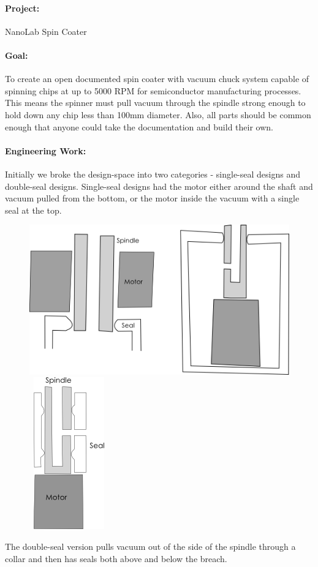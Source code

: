 \documentclass[12pt]{report}
\begin{document}
\paragraph{Project:} NanoLab Spin Coater
\paragraph{Goal:} To create an open documented spin coater with vacuum chuck system capable of spinning chips at up to 5000 RPM for semiconductor manufacturing processes. This means the spinner must pull vacuum through the spindle strong enough to hold down any chip less than 100mm diameter. Also, all parts should be common enough that anyone could take the documentation and build their own.

\paragraph{Engineering Work:} 
Initially we broke the design-space into two categories - single-seal designs and double-seal designs. Single-seal designs had the motor either around the shaft and vacuum pulled from the bottom, or the motor inside the vacuum with a single seal at the top.
\begin{figure}[H]
\includegraphics[scale=0.7]{spincoaterfig1} \, 
\includegraphics[scale=0.8]{spincoaterfig2}
\end{figure}
The double-seal version pulls vacuum out of the side of the spindle through a collar and then has seals both above and below the breach.
\end{document}
